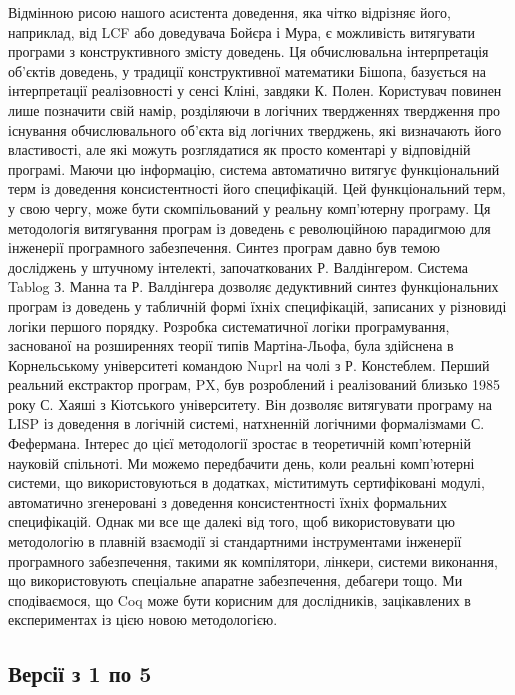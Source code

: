 \documentclass{article}
\begin{document}
Відмінною рисою нашого асистента доведення, яка чітко відрізняє його, наприклад, від LCF або доведувача Бойєра і Мура, є можливість витягувати програми з конструктивного змісту доведень. Ця обчислювальна інтерпретація об’єктів доведень, у традиції конструктивної математики Бішопа, базується на інтерпретації реалізовності у сенсі Кліні, завдяки К. Полен. Користувач повинен лише позначити свій намір, розділяючи в логічних твердженнях твердження про існування обчислювального об’єкта від логічних тверджень, які визначають його властивості, але які можуть розглядатися як просто коментарі у відповідній програмі. Маючи цю інформацію, система автоматично витягує функціональний терм із доведення консистентності його специфікацій. Цей функціональний терм, у свою чергу, може бути скомпільований у реальну комп’ютерну програму. Ця методологія витягування програм із доведень є революційною парадигмою для інженерії програмного забезпечення. Синтез програм давно був темою досліджень у штучному інтелекті, започаткованих Р. Валдінгером. Система Tablog З. Манна та Р. Валдінгера дозволяє дедуктивний синтез функціональних програм із доведень у табличній формі їхніх специфікацій, записаних у різновиді логіки першого порядку. Розробка систематичної логіки програмування, заснованої на розширеннях теорії типів Мартіна-Льофа, була здійснена в Корнельському університеті командою Nuprl на чолі з Р. Констеблем. Перший реальний екстрактор програм, PX, був розроблений і реалізований близько 1985 року С. Хаяші з Кіотського університету. Він дозволяє витягувати програму на LISP із доведення в логічній системі, натхненній логічними формалізмами С. Фефермана. Інтерес до цієї методології зростає в теоретичній комп’ютерній науковій спільноті. Ми можемо передбачити день, коли реальні комп’ютерні системи, що використовуються в додатках, міститимуть сертифіковані модулі, автоматично згенеровані з доведення консистентності їхніх формальних специфікацій. Однак ми все ще далекі від того, щоб використовувати цю методологію в плавній взаємодії зі стандартними інструментами інженерії програмного забезпечення, такими як компілятори, лінкери, системи виконання, що використовують спеціальне апаратне забезпечення, дебагери тощо. Ми сподіваємося, що Coq може бути корисним для дослідників, зацікавлених в експериментах із цією новою методологією.

\subsection{Версії з 1 по 5}
\end{document}

